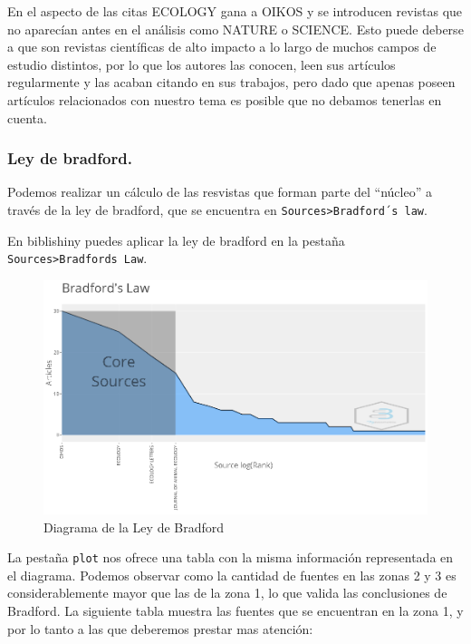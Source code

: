 \documentclass[
]{article}
\begin{document}
En el aspecto de las citas ECOLOGY gana a OIKOS y se introducen revistas
que no aparecían antes en el análisis como NATURE o SCIENCE. Esto puede
deberse a que son revistas científicas de alto impacto a lo largo de
muchos campos de estudio distintos, por lo que los autores las conocen,
leen sus artículos regularmente y las acaban citando en sus trabajos,
pero dado que apenas poseen artículos relacionados con nuestro tema es
posible que no debamos tenerlas en cuenta.

\hypertarget{ley-de-bradford.}{%
\subsubsection{Ley de bradford.}\label{ley-de-bradford.}}

Podemos realizar un cálculo de las resvistas que forman parte del
``núcleo'' a través de la ley de bradford, que se encuentra en
\texttt{Sources\textgreater{}Bradford´s\ law}.

En biblishiny puedes aplicar la ley de bradford en la pestaña
\texttt{Sources\textgreater{}Bradford\textquotesingle{}s\ Law}.

\begin{figure}
\centering
\includegraphics{BradfordsLaw.png}
\caption{Diagrama de la Ley de Bradford}
\end{figure}

La pestaña \texttt{plot} nos ofrece una tabla con la misma información
representada en el diagrama. Podemos observar como la cantidad de
fuentes en las zonas 2 y 3 es considerablemente mayor que las de la zona
1, lo que valida las conclusiones de Bradford. La siguiente tabla
muestra las fuentes que se encuentran en la zona 1, y por lo tanto a las
que deberemos prestar mas atención:
\end{document}
